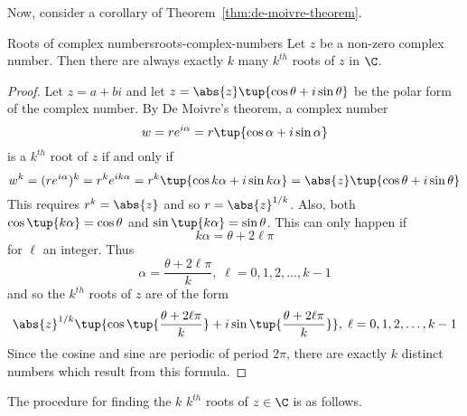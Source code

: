 Now, consider a corollary of Theorem~\ref{thm:de-moivre-theorem}.

\begin{corollary}{Roots of complex numbers}{roots-complex-numbers}
Let $z$ be a non-zero complex number.
Then there are always exactly $k$ many  $k^{th}$
roots of $z$ in $\C$.
\end{corollary}

\begin{proof}
Let $z=a+bi$ and let $z=\abs{z}\tup{\cos
\theta+i\sin \theta} $ be the polar form of the complex number. By De Moivre's
theorem, a complex number
\begin{equation*}
w= r e^{i \alpha} = r\tup{\cos \alpha +i\sin \alpha } 
\end{equation*}
is a $k^{th}$ root of $z$ if and only if
\begin{equation*}
w^k = (r e^{i \alpha})^k = r^k e^{ik\alpha} = r^{k}\tup{\cos k\alpha +i\sin k\alpha } =\abs{z}\tup{\cos \theta+i\sin \theta} 
\end{equation*}
This requires $r^{k}=\abs{z}$ and so $r=\abs{z}^{1/k}$. Also, both $\cos \tup{k\alpha } =\cos \theta$ and
$\sin \tup{k\alpha } =\sin \theta$. This can only happen if
\begin{equation*}
k\alpha =\theta+2 \ell \pi
\end{equation*}
for $\ell$ an integer. Thus
\begin{equation*}
\alpha =
\frac{\theta+2 \ell \pi }{k},\; \ell = 0, 1, 2,\ldots, k-1 
\end{equation*}
and so the $k^{th}$ roots of $z$ are of the form
\begin{equation*}
\abs{z}^{1/k}\tup{\cos \tup{\frac{\theta+2 \ell \pi }{k}}
+i\sin \tup{\frac{\theta+2 \ell \pi }{k}} } ,\;\ell = 0, 1, 2,\ldots, k-1 
\end{equation*}
Since the cosine and sine are periodic of period $2\pi$, there are exactly $
k$ distinct numbers which result from this formula. 
\end{proof}

The procedure for finding the $k$ $k^{th}$ roots of $z \in \C$ is as follows.

